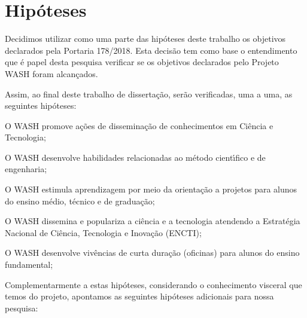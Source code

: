 \documentclass[
12pt,		%
openright,	%
twoside,  %
a4paper,			%
chapter=TITLE,		%
english,			%
french,				%
spanish,			%
brazil				%
]{USPSC-classe/USPSC}
\begin{document}
\section[Hip\'oteses]{Hip\'oteses}\label{Hip\'oteses}
Decidimos utilizar como uma parte das hip\'oteses deste trabalho os objetivos declarados pela Portaria 178/2018. Esta decis\~ao tem como base o entendimento que \'e papel desta pesquisa verificar se os objetivos declarados pelo Projeto WASH foram alcan\c{c}ados.














Assim, ao final deste trabalho de disserta\c{c}\~ao, ser\~ao verificadas, uma a uma, as seguintes hip\'oteses:















\begin{alineas}
\item O WASH promove a\c{c}\~oes de dissemina\c{c}\~ao de conhecimentos em Ci\^encia e Tecnologia;
\item O WASH desenvolve habilidades relacionadas ao m\'etodo cient\'{\i}fico e de engenharia;
\item O WASH estimula aprendizagem por meio da orienta\c{c}\~ao a projetos para alunos do ensino m\'edio, t\'ecnico e de gradua\c{c}\~ao;
\item O WASH dissemina e populariza a ci\^encia e a tecnologia atendendo a Estrat\'egia Nacional de Ci\^encia, Tecnologia e Inova\c{c}\~ao (ENCTI);
\item O WASH desenvolve viv\^encias de curta dura\c{c}\~ao (oficinas) para alunos do ensino fundamental;
\end{alineas}

Complementarmente a estas hip\'oteses, considerando o conhecimento visceral que temos do projeto, apontamos as seguintes hip\'oteses adicionais para nossa pesquisa:
\end{document}
